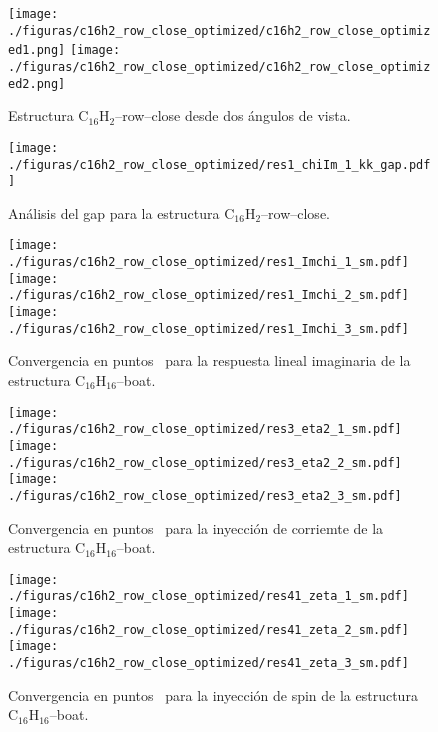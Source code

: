 \documentclass[11pt]{article}
\begin{document}
\begin{figure}[]
	\begin{center}
		\texttt{[image: ./figuras/c16h2\_row\_close\_optimized/c16h2\_row\_close\_optimized1.png]}
		\texttt{[image: ./figuras/c16h2\_row\_close\_optimized/c16h2\_row\_close\_optimized2.png]}
	\end{center}
	\caption{Estructura C$_{16}$H$_{2}$--row--close desde dos \'angulos de vista.}
	\label{fig:row_struct}
\end{figure}


\begin{figure}[]
	\begin{center}
		\texttt{[image: ./figuras/c16h2\_row\_close\_optimized/res1\_chiIm\_1\_kk\_gap.pdf]}
	\end{center}
	\caption{An\'alisis del gap para la estructura C$_{16}$H$_{2}$--row--close.}
	\label{fig:row_chi_im_gap}
\end{figure}

\begin{figure}[]
	\begin{center}
		\texttt{[image: ./figuras/c16h2\_row\_close\_optimized/res1\_Imchi\_1\_sm.pdf]}\\
		\texttt{[image: ./figuras/c16h2\_row\_close\_optimized/res1\_Imchi\_2\_sm.pdf]}\\
		\texttt{[image: ./figuras/c16h2\_row\_close\_optimized/res1\_Imchi\_3\_sm.pdf]}
	\end{center}
	\caption{Convergencia en puntos \vk \ para la respuesta lineal imaginaria  de la estructura C$_{16}$H$_{16}$--boat.}
	\label{fig:row_Imchi}
\end{figure}

\begin{figure}[]
	\begin{center}
		\texttt{[image: ./figuras/c16h2\_row\_close\_optimized/res3\_eta2\_1\_sm.pdf]}\\
		\texttt{[image: ./figuras/c16h2\_row\_close\_optimized/res3\_eta2\_2\_sm.pdf]}\\
		\texttt{[image: ./figuras/c16h2\_row\_close\_optimized/res3\_eta2\_3\_sm.pdf]}
	\end{center}
	\caption{Convergencia en puntos \vk \ para la inyecci\'on de corriemte  de la estructura C$_{16}$H$_{16}$--boat.}
	\label{fig:row_eta}
\end{figure}

\begin{figure}[]
	\begin{center}
		\texttt{[image: ./figuras/c16h2\_row\_close\_optimized/res41\_zeta\_1\_sm.pdf]}\\
		\texttt{[image: ./figuras/c16h2\_row\_close\_optimized/res41\_zeta\_2\_sm.pdf]}\\
		\texttt{[image: ./figuras/c16h2\_row\_close\_optimized/res41\_zeta\_3\_sm.pdf]}
	\end{center}
	\caption{Convergencia en puntos \vk \ para la inyecci\'on de spin  de la estructura C$_{16}$H$_{16}$--boat.}
	\label{fig:row_zeta}
\end{figure}
\end{document}
